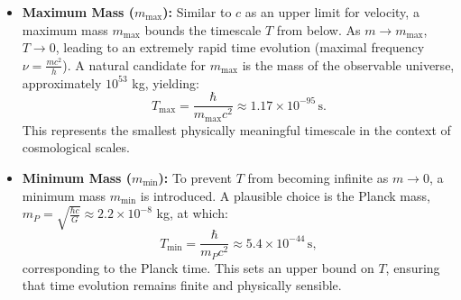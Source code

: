 \documentclass{article}
\begin{document}
\begin{itemize}
	\item \textbf{Maximum Mass ($m_{\text{max}}$):} Similar to $c$ as an upper limit for velocity, a maximum mass $m_{\text{max}}$ bounds the timescale $T$ from below. As $m \to m_{\text{max}}$, $T \to 0$, leading to an extremely rapid time evolution (maximal frequency $\nu = \frac{mc^2}{h}$). A natural candidate for $m_{\text{max}}$ is the mass of the observable universe, approximately $10^{53}$ kg, yielding:
	\[
	T_{\text{max}} = \frac{\hbar}{m_{\text{max}} c^2} \approx 1.17 \times 10^{-95} \, \text{s}.
	\]
	This represents the smallest physically meaningful timescale in the context of cosmological scales.
	
	\item \textbf{Minimum Mass ($m_{\text{min}}$):} To prevent $T$ from becoming infinite as $m \to 0$, a minimum mass $m_{\text{min}}$ is introduced. A plausible choice is the Planck mass, $m_P = \sqrt{\frac{\hbar c}{G}} \approx 2.2 \times 10^{-8}$ kg, at which:
	\[
	T_{\text{min}} = \frac{\hbar}{m_P c^2} \approx 5.4 \times 10^{-44} \, \text{s},
	\]
	corresponding to the Planck time. This sets an upper bound on $T$, ensuring that time evolution remains finite and physically sensible.
\end{itemize}
\end{document}
